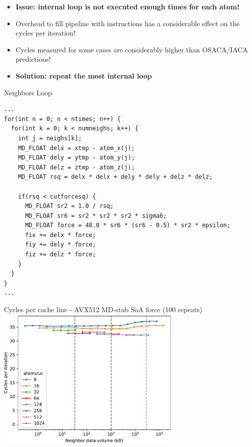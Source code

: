 \documentclass[aspectratio=169,t]{beamer}
\begin{document}
  \begin{frame}[fragile]{}
    \begin{itemize}
      \item \textbf{Issue: internal loop is not executed enough times for each atom!}
      \item Overhead to fill pipeline with instructions has a considerable effect on the cycles per iteration!
      \item Cycles measured for some cases are considerably higher than OSACA/IACA predictions!
      \item \textbf{Solution: repeat the most internal loop}
    \end{itemize}
  \end{frame}

  \begin{frame}[fragile]{Neighbors Loop}
    \begin{lstlisting}
...
for(int n = 0; n < ntimes; n++) {
  for(int k = 0; k < numneighs; k++) {
    int j = neighs[k];
    MD_FLOAT delx = xtmp - atom_x(j);
    MD_FLOAT dely = ytmp - atom_y(j);
    MD_FLOAT delz = ztmp - atom_z(j);
    MD_FLOAT rsq = delx * delx + dely * dely + delz * delz;

    if(rsq < cutforcesq) {
      MD_FLOAT sr2 = 1.0 / rsq;
      MD_FLOAT sr6 = sr2 * sr2 * sr2 * sigma6;
      MD_FLOAT force = 48.0 * sr6 * (sr6 - 0.5) * sr2 * epsilon;
      fix += delx * force;
      fiy += dely * force;
      fiz += delz * force;
    }
  }
}
...
    \end{lstlisting}
  \end{frame}

  \begin{frame}[fragile]{Cycles per cache line - AVX512 MD-stub SoA force  (100 repeats)}
    \includegraphics[width=9cm]{results_soa_casclakesp2_rep_neighbor_vol.pdf}
  \end{frame}
\end{document}
